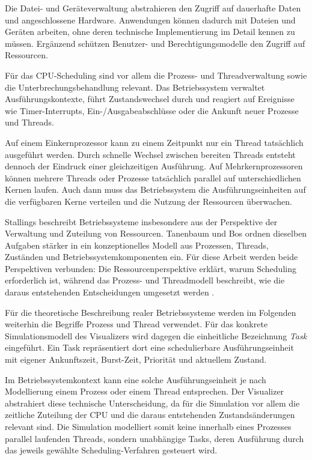 Die Datei- und Geräteverwaltung abstrahieren den Zugriff auf dauerhafte Daten und angeschlossene Hardware. Anwendungen können dadurch mit Dateien und Geräten arbeiten, ohne deren technische Implementierung im Detail kennen zu müssen. Ergänzend schützen Benutzer- und Berechtigungsmodelle den Zugriff auf Ressourcen.

Für das CPU-Scheduling sind vor allem die Prozess- und Threadverwaltung sowie die Unterbrechungsbehandlung relevant. Das Betriebssystem verwaltet Ausführungskontexte, führt Zustandswechsel durch und reagiert auf Ereignisse wie Timer-Interrupts, Ein-/Ausgabeabschlüsse oder die Ankunft neuer Prozesse und Threads.

Auf einem Einkernprozessor kann zu einem Zeitpunkt nur ein Thread tatsächlich ausgeführt werden. Durch schnelle Wechsel zwischen bereiten Threads entsteht dennoch der Eindruck einer gleichzeitigen Ausführung. Auf Mehrkernprozessoren können mehrere Threads oder Prozesse tatsächlich parallel auf unterschiedlichen Kernen laufen. Auch dann muss das Betriebssystem die Ausführungseinheiten auf die verfügbaren Kerne verteilen und die Nutzung der Ressourcen überwachen.

Stallings beschreibt Betriebssysteme insbesondere aus der Perspektive der Verwaltung und Zuteilung von Ressourcen. Tanenbaum und Bos ordnen dieselben Aufgaben stärker in ein konzeptionelles Modell aus Prozessen, Threads, Zuständen und Betriebssystemkomponenten ein. Für diese Arbeit werden beide Perspektiven verbunden: Die Ressourcenperspektive erklärt, warum Scheduling erforderlich ist, während das Prozess- und Threadmodell beschreibt, wie die daraus entstehenden Entscheidungen umgesetzt werden \cite{stallings_betriebssysteme,tanenbaum_moderne_betriebssysteme_de}.

Für die theoretische Beschreibung realer Betriebssysteme werden im Folgenden weiterhin die Begriffe Prozess und Thread verwendet. Für das konkrete Simulationsmodell des Visualizers wird dagegen die einheitliche Bezeichnung \textit{Task} eingeführt. Ein Task repräsentiert dort eine schedulierbare Ausführungseinheit mit eigener Ankunftszeit, Burst-Zeit, Priorität und aktuellem Zustand.

Im Betriebssystemkontext kann eine solche Ausführungseinheit je nach Modellierung einem Prozess oder einem Thread entsprechen. Der Visualizer abstrahiert diese technische Unterscheidung, da für die Simulation vor allem die zeitliche Zuteilung der CPU und die daraus entstehenden Zustandsänderungen relevant sind. Die Simulation modelliert somit keine innerhalb eines Prozesses parallel laufenden Threads, sondern unabhängige Tasks, deren Ausführung durch das jeweils gewählte Scheduling-Verfahren gesteuert wird.

